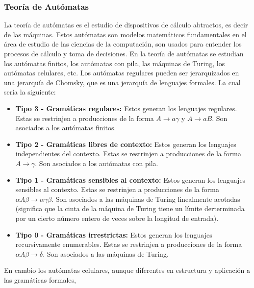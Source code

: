 \subsubsection{Teor\'ia de Aut\'omatas}
    \label{sec:TeoriaAutomatas}
    La teor\'ia de aut\'omatas es el estudio de dispositivos de c\'alculo abtractos, es decir de las m\'aquinas.\cite{Hopcroft1979}
        Estos aut\'omatas son modelos matem\'aticos fundamentales en el \'area de estudio de las ciencias de la computaci\'on, 
        son usados para entender los procesos de c\'alculo y toma de decisiones. En la teor\'ia de aut\'omatas se estudian
        los aut\'omatas finitos, los aut\'omatas con pila, las m\'aquinas de Turing, los aut\'omatas celulares, etc.
        Los aut\'omatas regulares pueden ser jerarquizados en una jerarqu\'ia de Chomsky\cite{Aranda2006}, que es una jerarqu\'ia de lenguajes formales.
        La cual ser\'ia la siguiente:
        \begin{itemize}
            \item \textbf{Tipo 3 - Gram\'aticas regulares:} Estos generan los lenguajes regulares.
                Estas se restrinjen a producciones de la forma $A \rightarrow a\gamma$ y $A \rightarrow aB$. Son 
                asociados a los aut\'omatas finitos.
            \item \textbf{Tipo 2 - Gram\'aticas libres de contexto:} Estos generan los lenguajes independientes del contexto.
                Estas se restrinjen a producciones de la forma $A \rightarrow \gamma$. Son asociados a los aut\'omatas con pila.
            \item \textbf{Tipo 1 - Gram\'aticas sensibles al contexto:} Estos generan los lenguajes sensibles al contexto.
                Estas se restrinjen a producciones de la forma ${\alpha}A{\beta} \rightarrow {\alpha}{\gamma}{\beta}$. 
                Son asociados a las m\'aquinas de Turing linealmente acotadas (significa que la cinta de la m\'aquina de Turing
                tiene un l\'imite derterminada por un cierto n\'umero entero de veces sobre la longitud de entrada).
            \item \textbf{Tipo 0 - Gram\'aticas irrestrictas:} Estos generan los lenguajes recursivamente enumerables.
                Estas se restrinjen a producciones de la forma ${\alpha}A{\beta} \rightarrow {\delta}$. Son asociados a las m\'aquinas de Turing.
        \end{itemize}
    \vskip 0.5cm
    En cambio los aut\'omatas celulares, aunque diferentes en estructura y aplicaci\'on a las gram\'aticas formales, 
